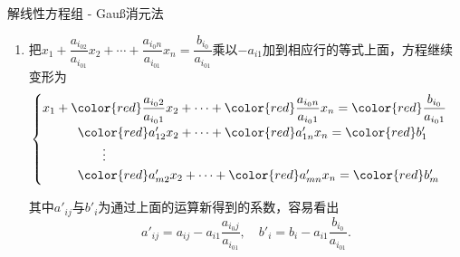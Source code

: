 
\begin{frame}{解线性方程组 - Gau{\ss}消元法}

\begin{enumerate}\addtocounter{enumi}{1}
\item 把$x_1 + \dfrac{a_{i_02}}{a_{i_01}}x_2 + \cdots + \dfrac{a_{i_0n}}{a_{i_01}}x_n = \dfrac{b_{i_0}}{a_{i_01}}$乘以$-a_{i1}$加到相应行的等式上面，方程继续变形为
\[
\begin{cases}
x_1 + {\color{red} \dfrac{a_{i_02}}{a_{i_01}}}x_2 + \cdots + {\color{red} \dfrac{a_{i_0n}}{a_{i_01}}}x_n = {\color{red} \dfrac{b_{i_0}}{a_{i_01}}} \\
\phantom{x_1 +a} {\color{red} a'_{12}}x_2 + \cdots + {\color{red} a'_{1n}}x_n = {\color{red} b'_1} \\
\phantom{yyyyyyyyy} \vdots \\
\phantom{x_1 +a} {\color{red} a'_{m2}}x_2 + \cdots + {\color{red} a'_{mn}}x_n = {\color{red} b'_m}
\end{cases}\]

\pause

其中$a'_{ij}$与$b'_i$为通过上面的运算新得到的系数，容易看出
\[a'_{ij} = a_{ij} - a_{i1}\dfrac{a_{i_0j}}{a_{i_01}}, \quad b'_{i} = b_{i} - a_{i1}\dfrac{b_{i_0}}{a_{i_01}}.\]
\end{enumerate}

\end{frame}


